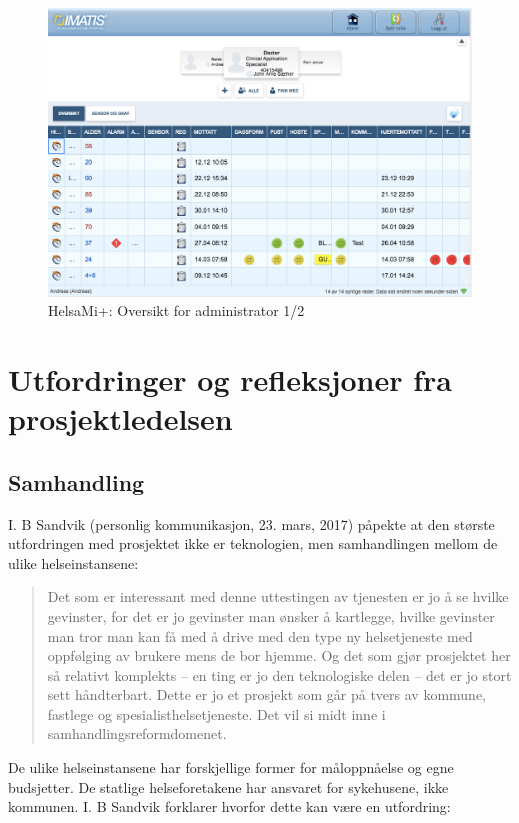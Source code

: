 \begin{figure}
\includegraphics[width=1.0\textwidth,center]{fig/helsami/admin_oversikt}
\caption{HelsaMi+: Oversikt for administrator 1/2}
\label{fig:helsami_admin1}
\end{figure}

\section{Utfordringer og refleksjoner fra prosjektledelsen}

\subsection{Samhandling}
I. B Sandvik (personlig kommunikasjon, 23. mars, 2017) påpekte at den største utfordringen med prosjektet ikke er teknologien, men samhandlingen mellom de ulike
helseinstansene:

\blockquote{Det som er interessant med denne uttestingen av tjenesten er jo å se hvilke gevinster, for det er jo gevinster man ønsker å kartlegge, hvilke gevinster man tror
    man kan få med å drive med den type ny helsetjeneste med oppfølging av brukere mens de bor hjemme. Og det som gjør prosjektet her så relativt komplekts -- en ting
    er jo den teknologiske delen -- det er jo stort sett håndterbart. Dette er jo et prosjekt som går på tvers av kommune, fastlege og spesialisthelsetjeneste. Det vil
si midt inne i samhandlingsreformdomenet.}

De ulike helseinstansene har forskjellige former for måloppnåelse og egne budsjetter. De statlige helseforetakene har ansvaret for sykehusene,
ikke kommunen. I. B Sandvik forklarer hvorfor dette kan være en utfordring:

